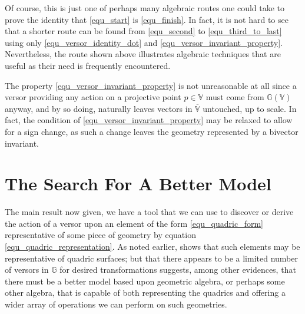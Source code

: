 \documentclass{birkjour}
\theoremstyle{definition}
\theoremstyle{remark}
\numberwithin{equation}{section}
\newcommand{\G}{\mathbb{G}}
\newcommand{\V}{\mathbb{V}}
\begin{document}
Of course, this is just one of perhaps many algebraic routes one could take to prove the
identity that \eqref{equ_start} is \eqref{equ_finish}.  In fact, it is not hard to see that
a shorter route can be found from \eqref{equ_second} to \eqref{equ_third_to_last} using only
\eqref{equ_versor_identity_dot} and \eqref{equ_versor_invariant_property}.  Nevertheless,
the route shown above illustrates algebraic techniques that are useful as their need is frequently encountered.

The property \eqref{equ_versor_invariant_property} is not unreasonable at all
since a versor providing any action on a projective point $p\in\V$ must come from $\G(\V)$ anyway,
and by so doing, naturally leaves vectors in $\overline{\V}$ untouched, up to scale.
In fact, the condition of \eqref{equ_versor_invariant_property} may be relaxed to allow
for a sign change, as such a change leaves the geometry represented by a bivector invariant.

\section{The Search For A Better Model}

The main result now given, we have a tool that we can use to discover or derive the
action of a versor upon an element of the form \eqref{equ_quadric_form} representative of some piece of geometry
by equation \eqref{equ_quadric_representation}.  As noted earlier, \cite{Parkin12} shows that such elements may
be representative of quadric surfaces; but that there appears to be a limited number of
versors in $\G$ for desired transformations suggests, among other evidences, that there must
be a better model based upon geometric algebra, or perhaps some other algebra, that is capable of both representing the
quadrics and offering a wider array of operations we  can perform on such geometries.
\end{document}
